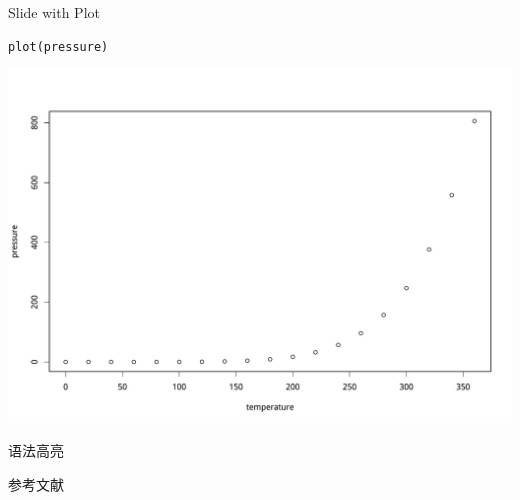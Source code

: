 \documentclass[ignorenonframetext,hyperref,x11names,UTF8]{beamer}
\newif\ifbibliography
\begin{document}
\begin{frame}[fragile]{Slide with Plot}

\begin{verbatim}
plot(pressure)
\end{verbatim}

\begin{center}\includegraphics[width=.7\textwidth]{oral-defense_files/figure-beamer/pressure-1} \end{center}

\end{frame}

\begin{frame}{语法高亮}

\end{frame}

\renewcommand\refname{参考文献}
\begin{frame}[allowframebreaks]{参考文献}
\bibliographytrue

\end{frame}
\end{document}
